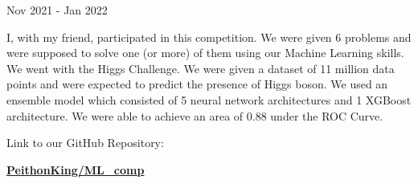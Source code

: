 	
	\hspace*{8.2mm}\faCalendar Nov 2021 - Jan 2022
	\vspace{-2mm}
	\begin{justify}
		\hspace{3mm} I, with my friend, participated in this competition. We were given 6 problems and were supposed to solve one (or more) of them using our Machine Learning skills. We went with the Higgs Challenge. We were given a dataset of 11 million data points and were expected to predict the presence of Higgs boson. We used an ensemble model which consisted of 5 neural network architectures and 1 XGBoost architecture. We were able to achieve an area of 0.88 under the ROC Curve.

		Link to our GitHub Repository:
		
		\href{https://github.com/PeithonKing/ML_comp}{\textbf{PeithonKing/ML\_comp}}
	\end{justify}